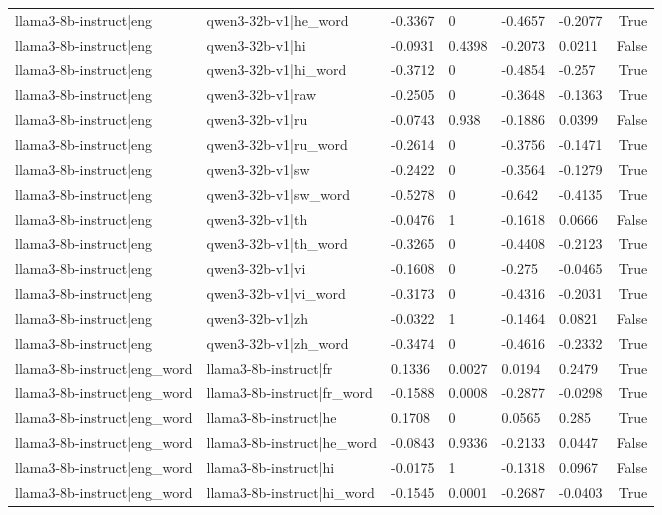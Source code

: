 \begin{table}
\begin{tabular}{llllllr}
llama3-8b-instruct|eng & qwen3-32b-v1|he_word & -0.3367 & 0 & -0.4657 & -0.2077 & True \\
llama3-8b-instruct|eng & qwen3-32b-v1|hi & -0.0931 & 0.4398 & -0.2073 & 0.0211 & False \\
llama3-8b-instruct|eng & qwen3-32b-v1|hi_word & -0.3712 & 0 & -0.4854 & -0.257 & True \\
llama3-8b-instruct|eng & qwen3-32b-v1|raw & -0.2505 & 0 & -0.3648 & -0.1363 & True \\
llama3-8b-instruct|eng & qwen3-32b-v1|ru & -0.0743 & 0.938 & -0.1886 & 0.0399 & False \\
llama3-8b-instruct|eng & qwen3-32b-v1|ru_word & -0.2614 & 0 & -0.3756 & -0.1471 & True \\
llama3-8b-instruct|eng & qwen3-32b-v1|sw & -0.2422 & 0 & -0.3564 & -0.1279 & True \\
llama3-8b-instruct|eng & qwen3-32b-v1|sw_word & -0.5278 & 0 & -0.642 & -0.4135 & True \\
llama3-8b-instruct|eng & qwen3-32b-v1|th & -0.0476 & 1 & -0.1618 & 0.0666 & False \\
llama3-8b-instruct|eng & qwen3-32b-v1|th_word & -0.3265 & 0 & -0.4408 & -0.2123 & True \\
llama3-8b-instruct|eng & qwen3-32b-v1|vi & -0.1608 & 0 & -0.275 & -0.0465 & True \\
llama3-8b-instruct|eng & qwen3-32b-v1|vi_word & -0.3173 & 0 & -0.4316 & -0.2031 & True \\
llama3-8b-instruct|eng & qwen3-32b-v1|zh & -0.0322 & 1 & -0.1464 & 0.0821 & False \\
llama3-8b-instruct|eng & qwen3-32b-v1|zh_word & -0.3474 & 0 & -0.4616 & -0.2332 & True \\
llama3-8b-instruct|eng_word & llama3-8b-instruct|fr & 0.1336 & 0.0027 & 0.0194 & 0.2479 & True \\
llama3-8b-instruct|eng_word & llama3-8b-instruct|fr_word & -0.1588 & 0.0008 & -0.2877 & -0.0298 & True \\
llama3-8b-instruct|eng_word & llama3-8b-instruct|he & 0.1708 & 0 & 0.0565 & 0.285 & True \\
llama3-8b-instruct|eng_word & llama3-8b-instruct|he_word & -0.0843 & 0.9336 & -0.2133 & 0.0447 & False \\
llama3-8b-instruct|eng_word & llama3-8b-instruct|hi & -0.0175 & 1 & -0.1318 & 0.0967 & False \\
llama3-8b-instruct|eng_word & llama3-8b-instruct|hi_word & -0.1545 & 0.0001 & -0.2687 & -0.0403 & True \\

\end{tabular}
\end{table}
